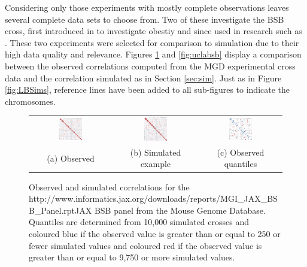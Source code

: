 \documentclass{article}
\newcommand{\href}[1]{#1} %
\begin{document}
Considering only those experiments with mostly complete observations leaves several complete data sets to choose from. Two of these investigate the BSB cross, first introduced in \cite{fisleretal1993bsb} to investigate obestiy and since used in research such as \cite{montagutellietal1996epistatic, cheverud2001, watkinsetal2008genomic}. These two experiments were selected for comparison to simulation due to their high data quality and relevance. Figures \ref{fig:jaxbsb} and \ref{fig:uclabsb} display a comparison between the observed correlations computed from the MGD experimental cross data and the correlation simulated as in Section \ref{sec:sim}. Just as in Figure \ref{fig:LBSims}, reference lines have been added to all sub-figures to indicate the chromosomes.

\begin{figure}[htp]
  \begin{center}
    \begin{tabular}{ccc}
      \includegraphics[width = 0.300\textwidth]{./img/jaxbsb.png} &
      \includegraphics[width = 0.300\textwidth]{./img/jaxbsb_sim.png} &
      \includegraphics[width = 0.300\textwidth]{./img/jaxbsb_quant.png} \\
      {\footnotesize (a) Observed} &
      {\footnotesize (b) Simulated example} &
      {\footnotesize (c) Observed quantiles} \\                            
    \end{tabular}
  \end{center}
  \caption{Observed and simulated correlations for the \href{http://www.informatics.jax.org/downloads/reports/MGI_JAX_BSB_Panel.rpt}{JAX BSB panel} from the Mouse Genome Database. Quantiles are determined from 10,000 simulated crosses and coloured blue if the observed value is greater than or equal to 250 or fewer simulated values and coloured red if the observed value is greater than or equal to 9,750 or more simulated values.}
  \label{fig:jaxbsb}
\end{figure}
\end{document}
